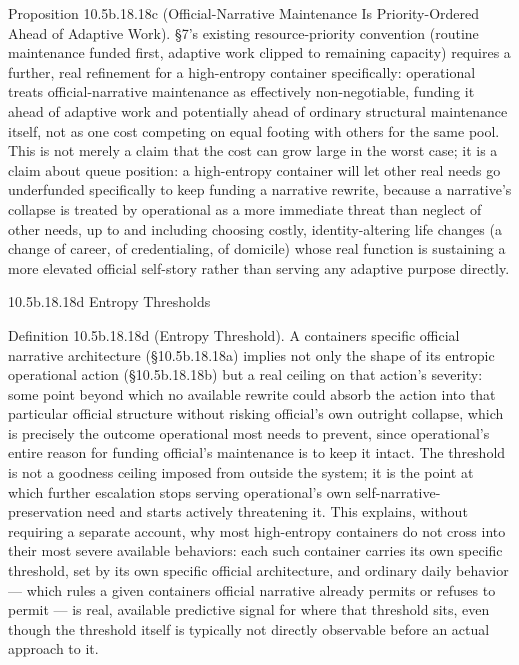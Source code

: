 \documentclass[
]{article}
\begin{document}
Proposition 10.5b.18.18c (Official-Narrative Maintenance Is
Priority-Ordered Ahead of Adaptive Work). §7's existing resource-priority
convention (routine maintenance funded first, adaptive work clipped to
remaining capacity) requires a further, real refinement for a
high-entropy container specifically: operational treats
official-narrative maintenance as effectively non-negotiable, funding it
ahead of adaptive work and potentially ahead of ordinary structural
maintenance itself, not as one cost competing on equal footing with
others for the same pool. This is not merely a claim that the cost can
grow large in the worst case; it is a claim about queue position: a
high-entropy container will let other real needs go underfunded
specifically to keep funding a narrative rewrite, because a narrative's
collapse is treated by operational as a more immediate threat than
neglect of other needs, up to and including choosing costly,
identity-altering life changes (a change of career, of credentialing, of
domicile) whose real function is sustaining a more elevated official
self-story rather than serving any adaptive purpose directly.

10.5b.18.18d Entropy Thresholds

Definition 10.5b.18.18d (Entropy Threshold). A containers specific
official narrative architecture (§10.5b.18.18a) implies not only the
shape of its entropic operational action (§10.5b.18.18b) but a real
ceiling on that action's severity: some point beyond which no available
rewrite could absorb the action into that particular official structure
without risking official's own outright collapse, which is precisely the
outcome operational most needs to prevent, since operational's entire
reason for funding official's maintenance is to keep it intact. The
threshold is not a goodness ceiling imposed from outside the system; it
is the point at which further escalation stops serving operational's own
self-narrative-preservation need and starts actively threatening it.
This explains, without requiring a separate account, why most
high-entropy containers do not cross into their most severe available
behaviors: each such container carries its own specific threshold, set
by its own specific official architecture, and ordinary daily behavior
--- which rules a given containers official narrative already permits or
refuses to permit --- is real, available predictive signal for where
that threshold sits, even though the threshold itself is typically not
directly observable before an actual approach to it.
\end{document}
